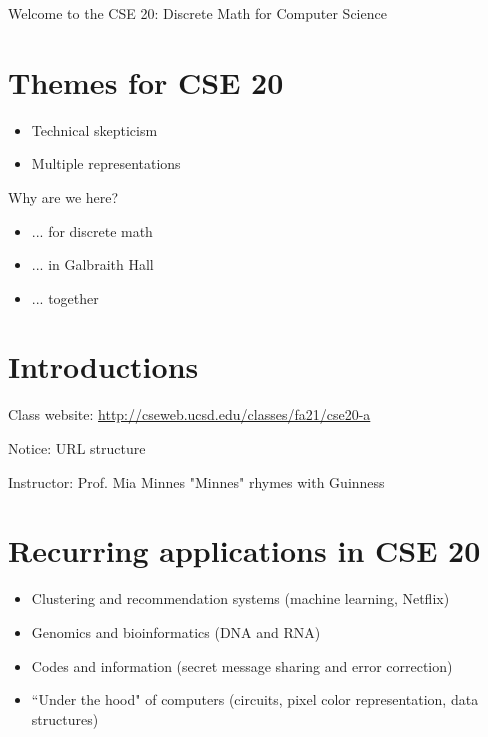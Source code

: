 

Welcome to the CSE 20: Discrete Math for Computer Science

\section*{Themes for CSE 20}
\begin{itemize}
\item Technical skepticism
\item Multiple representations
\end{itemize}

Why are we here?
\begin{itemize}
\item ... for discrete math
\item ... in Galbraith Hall
\item ... together
\end{itemize}

\section*{Introductions}
Class website: \href{http://cseweb.ucsd.edu/classes/fa21/cse20-a}{http://cseweb.ucsd.edu/classes/fa21/cse20-a}

Notice: URL structure

Instructor: Prof. Mia Minnes {\tiny{"Minnes" rhymes with Guinness}}


\section*{Recurring applications in CSE 20}
\begin{itemize}
\item Clustering and recommendation systems (machine learning, Netflix)
\item Genomics and bioinformatics (DNA and RNA)
\item Codes and information (secret message sharing and error correction)
\item ``Under the hood" of computers (circuits, pixel color representation, data structures)
\end{itemize}

